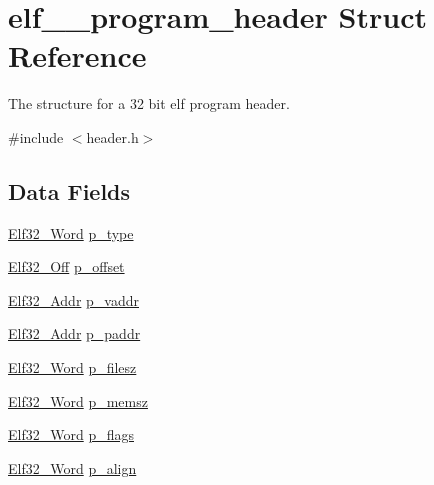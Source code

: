 \hypertarget{structelf__32__program__header}{
\section{elf\_\_\-program\_\-header Struct Reference}
\label{structelf__32__program__header}
}


The structure for a 32 bit elf program header.  




{\ttfamily \#include $<$header.h$>$}

\subsection*{Data Fields}
\begin{DoxyCompactItemize}
\item 
\hyperlink{header_8h_aaf2adb6079d594afee7de40cee594c34}{Elf32\_\-Word} \hyperlink{structelf__32__program__header_af220a98c5b7f9968195246e76afc2c86}{p\_\-type}
\item 
\hyperlink{header_8h_aa29786fd537fb0970d39bb3b9ed48e96}{Elf32\_\-Off} \hyperlink{structelf__32__program__header_aa3e8460560d072a37656cf4fdf4839f6}{p\_\-offset}
\item 
\hyperlink{header_8h_a6041cee195469c34b94c8605b53a98f9}{Elf32\_\-Addr} \hyperlink{structelf__32__program__header_ab11f74e50c7ef5781fceeb94d729d423}{p\_\-vaddr}
\item 
\hyperlink{header_8h_a6041cee195469c34b94c8605b53a98f9}{Elf32\_\-Addr} \hyperlink{structelf__32__program__header_ac29cb8df1e8341ad6184020d374718b3}{p\_\-paddr}
\item 
\hyperlink{header_8h_aaf2adb6079d594afee7de40cee594c34}{Elf32\_\-Word} \hyperlink{structelf__32__program__header_adea383271339e61d6dc701a292fd6596}{p\_\-filesz}
\item 
\hyperlink{header_8h_aaf2adb6079d594afee7de40cee594c34}{Elf32\_\-Word} \hyperlink{structelf__32__program__header_a9b8d565ea2d52584f038a437a7c714c7}{p\_\-memsz}
\item 
\hyperlink{header_8h_aaf2adb6079d594afee7de40cee594c34}{Elf32\_\-Word} \hyperlink{structelf__32__program__header_a98c788bfdf95178f0e590c086002eaf9}{p\_\-flags}
\item 
\hyperlink{header_8h_aaf2adb6079d594afee7de40cee594c34}{Elf32\_\-Word} \hyperlink{structelf__32__program__header_a2a8ee61f9995f7be7f3fedf4b7ba12c6}{p\_\-align}
\end{DoxyCompactItemize}


